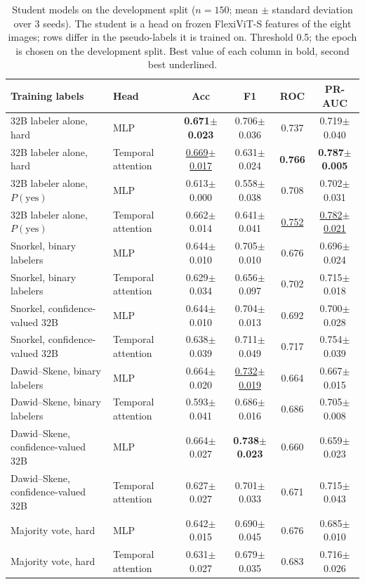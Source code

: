 \begin{table}[t]
\centering
\footnotesize
\setlength{\tabcolsep}{3pt}
\caption{Student models on the development split ($n=150$; mean $\pm$ standard deviation over 3 seeds). The student is a head on frozen FlexiViT-S features of the eight images; rows differ in the pseudo-labels it is trained on. Threshold 0.5; the epoch is chosen on the development split. Best value of each column in bold, second best underlined.}
\label{tab:students}
\begin{tabular}{llcccc}
\toprule
Training labels & Head & Acc & F1 & ROC & PR-AUC \\
\midrule
32B labeler alone, hard & MLP & \textbf{0.671$\pm$0.023} & 0.706$\pm$0.036 & 0.737 & 0.719$\pm$0.040  \\
32B labeler alone, hard & Temporal attention & \underline{0.669$\pm$0.017} & 0.631$\pm$0.024 & \textbf{0.766} & \textbf{0.787$\pm$0.005} \\
32B labeler alone, $P(\mathrm{yes})$ & MLP & 0.613$\pm$0.000 & 0.558$\pm$0.038 & 0.708 & 0.702$\pm$0.031  \\
32B labeler alone, $P(\mathrm{yes})$ & Temporal attention & 0.662$\pm$0.014 & 0.641$\pm$0.041 & \underline{0.752} & \underline{0.782$\pm$0.021} \\
Snorkel, binary labelers & MLP & 0.644$\pm$0.010 & 0.705$\pm$0.010 & 0.676 & 0.696$\pm$0.024  \\
Snorkel, binary labelers & Temporal attention & 0.629$\pm$0.034 & 0.656$\pm$0.097 & 0.702 & 0.715$\pm$0.018  \\
Snorkel, confidence-valued 32B & MLP & 0.644$\pm$0.010 & 0.704$\pm$0.013 & 0.692 & 0.700$\pm$0.028  \\
Snorkel, confidence-valued 32B & Temporal attention & 0.638$\pm$0.039 & 0.711$\pm$0.049 & 0.717 & 0.754$\pm$0.039  \\
Dawid--Skene, binary labelers & MLP & 0.664$\pm$0.020 & \underline{0.732$\pm$0.019} & 0.664 & 0.667$\pm$0.015  \\
Dawid--Skene, binary labelers & Temporal attention & 0.593$\pm$0.041 & 0.686$\pm$0.016 & 0.686 & 0.705$\pm$0.008  \\
Dawid--Skene, confidence-valued 32B & MLP & 0.664$\pm$0.027 & \textbf{0.738$\pm$0.023} & 0.660 & 0.659$\pm$0.023  \\
Dawid--Skene, confidence-valued 32B & Temporal attention & 0.627$\pm$0.027 & 0.701$\pm$0.033 & 0.671 & 0.715$\pm$0.043  \\
Majority vote, hard & MLP & 0.642$\pm$0.015 & 0.690$\pm$0.045 & 0.676 & 0.685$\pm$0.010  \\
Majority vote, hard & Temporal attention & 0.631$\pm$0.027 & 0.679$\pm$0.035 & 0.683 & 0.716$\pm$0.026  \\
\bottomrule
\end{tabular}
\end{table}
